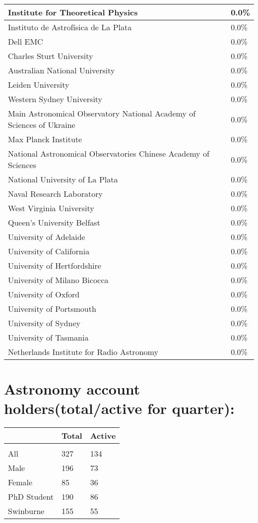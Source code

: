 \documentclass{article}%
\begin{document}
\begin{longtabu}{X[l] X[r]}
\hline%
Institute for Theoretical Physics&0.0\%\\%
\hline%
Instituto de Astrofísica de La Plata&0.0\%\\%
\hline%
Dell EMC&0.0\%\\%
\hline%
Charles Sturt University&0.0\%\\%
\hline%
Australian National University&0.0\%\\%
\hline%
Leiden University&0.0\%\\%
\hline%
Western Sydney University&0.0\%\\%
\hline%
Main Astronomical Observatory National Academy of Sciences of Ukraine&0.0\%\\%
\hline%
Max Planck Institute&0.0\%\\%
\hline%
National Astronomical Observatories Chinese Academy of Sciences&0.0\%\\%
\hline%
National University of La Plata&0.0\%\\%
\hline%
Naval Research Laboratory&0.0\%\\%
\hline%
West Virginia University&0.0\%\\%
\hline%
Queen's University Belfast&0.0\%\\%
\hline%
University of Adelaide&0.0\%\\%
\hline%
University of California&0.0\%\\%
\hline%
University of Hertfordshire&0.0\%\\%
\hline%
University of Milano Bicocca&0.0\%\\%
\hline%
University of Oxford&0.0\%\\%
\hline%
University of Portsmouth&0.0\%\\%
\hline%
University of Sydney&0.0\%\\%
\hline%
University of Tasmania&0.0\%\\%
\hline%
Netherlands Institute for Radio Astronomy&0.0\%\\%
\hline%
\end{longtabu}%
\section{Astronomy account holders(total/active for quarter): }%

%
\begin{longtabu}{X[l] X[r] X[r]}%
\textbf{}&\textbf{Total}&\textbf{Active}\\%
\hline%
&&\\%
All&327&134\\%
\hline%
Male&196&73\\%
\hline%
Female&85&36\\%
\hline%
PhD Student&190&86\\%
\hline%
Swinburne&155&55\\%
\hline%
\end{longtabu}%
\end{document}
